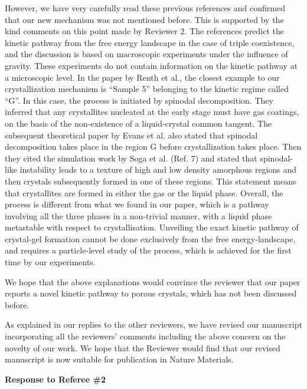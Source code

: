 \documentclass[11pt,a4paper]{article}
\begin{document}
However, we have very carefully read these previous references and confirmed that our new mechanism was not mentioned before. This is supported by the kind comments on this point made by Reviewer 2. The references predict the kinetic pathway from the free energy landscape in the case of triple coexistence, and the discussion
is based on macroscopic experiments under the influence of gravity. These experiments do not contain information on the kinetic pathway at a microscopic level.
In the paper by Renth et al., the closest example to our crystallization mechanism is ``Sample 5'' belonging to the kinetic regime called ``G''. In this case, the process is initiated by spinodal decomposition. They inferred that any crystallites nucleated at the early stage must have gas coatings, on the basis of the non-existence of a liquid-crystal common tangent. The subsequent theoretical paper by Evans et al. also stated that spinodal decomposition takes place in the region G before crystallization takes place. Then they cited the simulation work by Soga et al. (Ref. 7) and 
stated that spinodal-like instability leads to a texture of high and low density amorphous regions and then crystals subsequently formed in one of these regions. This statement means that crystallites are formed in either the gas or the liquid phase. Overall, the process is different from what we found in our paper, which is a pathway involving all the three phases in a non-trivial manner, with a liquid phase metastable with respect to crystallisation. Unveiling the exact kinetic pathway of crystal-gel formation cannot 
be done exclusively from the free energy-landscape, and requires a particle-level study of the process, which is achieved for the first time by our experiments.

We hope that the above explanations would convince the reviewer that our paper reports a novel kinetic pathway to porous crystals, which has not been discussed before. 

As explained in our replies to the other reviewers, we have revised our manuscript incorporating all the reviewers’ comments including the above concern on the novelty of our work. 
We hope that the Reviewer would find that our revised manuscript is now suitable for publication in Nature Materials. 


\clearpage

\noindent
\begin{Large}
{\bf Response to Referee \#2}
\end{Large}
\end{document}

